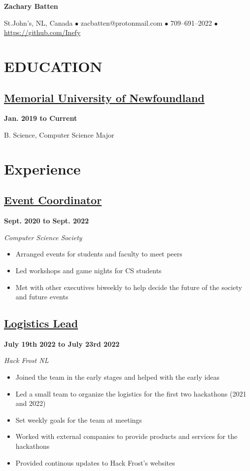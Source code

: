 \documentclass[12pt]{extarticle}
\begin{document}
\begin{center}
\textbf{\huge{Zachary Batten}}

St.John's, NL, Canada
$\bullet$ zacbatten@protonmail.com
$\bullet$ 709--691--2022
$\bullet$ \href{https://github.com/Inefy}{https://github.com/Inefy}
\end{center}

\section*{EDUCATION}
\subsection*{\href{https://www.mun.ca/}{Memorial University of Newfoundland} 
}
\hfill \textbf{Jan. 2019 to Current}

B. Science, Computer Science Major

\section*{Experience}

\subsection*{\href{https://muncompsci.ca/}{Event Coordinator} 
}
\hfill \textbf{Sept. 2020 to Sept. 2022}

\textit{Computer Science Society}
\begin{itemize}
  \item Arranged events for students and faculty to meet peers
  \item Led workshops and game nights for CS students
  \item Met with other executives biweekly to help decide the future of the society and future events
\end{itemize}

\subsection*{\href{https://hackfrostnl.ca/}{Logistics Lead}
} \hfill \textbf{July 19th 2022 to July 23rd 2022}

\textsl{Hack Frost NL}
\begin{itemize}
  \item Joined the team in the early stages and helped with the early ideas
  \item Led a small team to organize the logistics for the first two hackathons (2021 and 2022)
  \item Set weekly goals for the team at meetings
  \item Worked with external companies to provide products and services for the hackathons
  \item Provided continous updates to Hack Frost's websites
\end{itemize}
\end{document}
